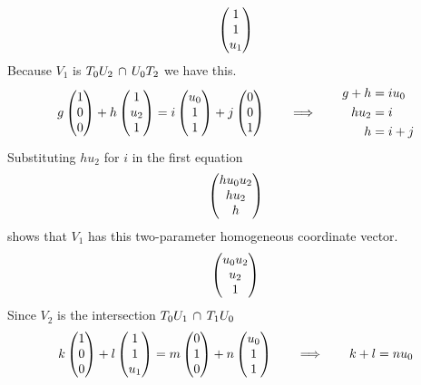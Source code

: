 \begin{exercises}
\begin{answer}
\begin{exparts}
\begin{equation*}
            \begin{pmatrix} 1 \\ 1 \\ u_1 \end{pmatrix}
          \end{equation*}
        \partsitem
          Because $V_1$ is $T_0U_2\,\cap\,U_0T_2$ we have this.
          \begin{equation*}
            g\begin{pmatrix} 1 \\ 0 \\ 0 \end{pmatrix}+h\begin{pmatrix} 1 \\ u_2 \\ 1 \end{pmatrix}
            =i\begin{pmatrix} u_0 \\ 1 \\ 1 \end{pmatrix}+j\begin{pmatrix} 0 \\ 0 \\ 1 \end{pmatrix}
            \qquad\Longrightarrow\qquad
            \begin{aligned}
              g+h  &= iu_0 \\
              hu_2 &= i    \\
              h    &= i+j
            \end{aligned}
          \end{equation*}
          Substituting $hu_2$ for $i$ in the first equation 
          \begin{equation*}
            \begin{pmatrix} hu_0u_2 \\ hu_2 \\ h \end{pmatrix}
          \end{equation*}
          shows that $V_1$ has this 
          two-parameter homogeneous coordinate vector.
          \begin{equation*}
            \begin{pmatrix} u_0u_2 \\ u_2 \\ 1 \end{pmatrix}
          \end{equation*}
        \partsitem
           Since $V_2$ is the intersection 
           $T_0U_1\,\cap\,T_1U_0$ 
           \begin{equation*}
             k\colvec{1 \\ 0 \\ 0}+l\colvec{1 \\ 1 \\ u_1}
              =m\colvec{0 \\ 1 \\ 0}+n\colvec{u_0 \\ 1 \\ 1}
            \qquad\Longrightarrow\qquad
            \begin{aligned}
              k+l  &= nu_0 \\

\end{aligned}
\end{equation*}
\end{exparts}
\end{answer}
\end{exercises}
